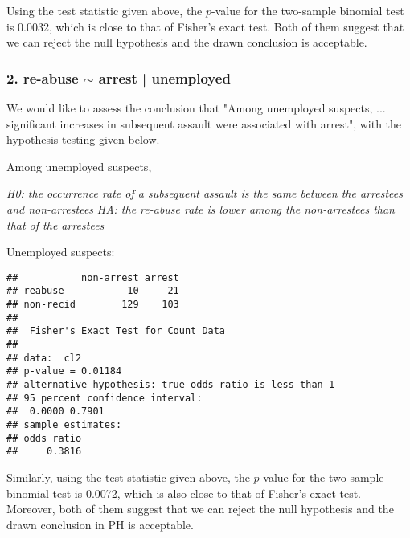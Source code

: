 \documentclass{article}\usepackage{graphicx, color}
\makeatletter
\newenvironment{kframe}{%
 \def\at@end@of@kframe{}%
 \ifinner\ifhmode%
  \def\at@end@of@kframe{\end{minipage}}%
  \begin{minipage}{\columnwidth}%
 \fi\fi%
 \def\FrameCommand##1{\hskip\@totalleftmargin \hskip-\fboxsep
 \colorbox{shadecolor}{##1}\hskip-\fboxsep
     \hskip-\linewidth \hskip-\@totalleftmargin \hskip\columnwidth}%
 \MakeFramed {\advance\hsize-\width
   \@totalleftmargin\z@ \linewidth\hsize
   \@setminipage}}%
 {\par\unskip\endMakeFramed%
 \at@end@of@kframe}
\newenvironment{knitrout}{}{} %
\makeatother
\begin{document}
Using the test statistic given above, the $p$-value for the two-sample
binomial test is 0.0032, which is
close to that of Fisher's exact test. Both of them suggest that we can
reject the null hypothesis and the drawn conclusion is acceptable.



\subsubsection*{2. re-abuse $\sim$ arrest | unemployed}
\hspace{12 pt} We would like to assess the conclusion that "Among
unemployed suspects, ... significant increases in subsequent assault
were associated with arrest", with the hypothesis
testing given below.


Among unemployed suspects,


\hspace{12 pt} \textit{H0: the occurrence rate of a subsequent assault
  is the same between the arrestees and non-arrestees} \newline
\vspace{2 pt}
\hspace{24 pt} \textit{HA: the re-abuse rate is lower among the
  non-arrestees than that of the arrestees} \newline

\newpage
Unemployed suspects:
\begin{knitrout}
\color{fgcolor}\begin{kframe}
\begin{verbatim}
##           non-arrest arrest
## reabuse           10     21
## non-recid        129    103
## 
## 	Fisher's Exact Test for Count Data
## 
## data:  cl2 
## p-value = 0.01184
## alternative hypothesis: true odds ratio is less than 1 
## 95 percent confidence interval:
##  0.0000 0.7901 
## sample estimates:
## odds ratio 
##     0.3816
\end{verbatim}
\end{kframe}
\end{knitrout}



Similarly, using the test statistic given above, the $p$-value for the two-sample
binomial test is 0.0072, which is also
close to that of Fisher's exact test. Moreover, both of them suggest that we can
reject the null hypothesis and the drawn conclusion in PH is acceptable.
\end{document}
